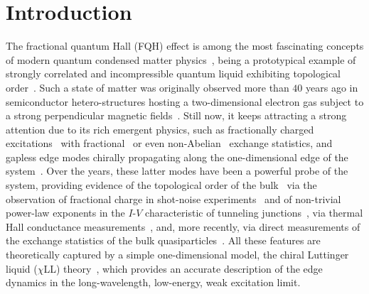 \documentclass[twocolumn,pra,superscriptaddress,noshowpacs]{revtex4}
\begin{document}
\section{Introduction }\label{sec:introduction}
The fractional quantum Hall (FQH) effect is among the most fascinating concepts of modern quantum condensed matter physics~\cite{jainCompositeFermionsBook_2007,prangeQHE2012}, being a prototypical example of strongly correlated and incompressible quantum liquid exhibiting topological order~\cite{Wen_science_2019}.
Such a state of matter was originally observed more than $40$ years ago in semiconductor hetero-structures hosting a two-dimensional electron gas subject to a strong perpendicular magnetic fields~\cite{Tsui_PRL_1982}. Still now, it keeps attracting a strong attention due to its rich emergent physics, such as fractionally charged excitations~\cite{Laughlin_PRL_1983,Tsui_PRL_1982} with fractional~\cite{Arovas_PRL_1984} or even non-Abelian~\cite{Nayak_RMP_2008} exchange statistics, and gapless edge modes chirally propagating along the one-dimensional edge of the system~\cite{Wen_PRL_1990,Wen_PRB_1990b,Wen_PRB_1991, Wen_AdvPhys_1995,Wen_intJModPhysB_1992,Chang_RMP_2003}.
Over the years, these latter modes have been a powerful probe of the system, providing evidence of the topological order of the bulk~\cite{Wen_AdvPhys_1995} via the observation of fractional charge in shot-noise experiments~\cite{dePicciotto_nat_1997} and of non-trivial power-law exponents in the $I$-$V$ characteristic of tunneling junctions~\cite{Chang_PRL_1996, Chang_RMP_2003}, via thermal Hall conductance measurements~\cite{Banerjee_Nat_2018,Umansky_NatPhys_2023}, and, more recently, via direct measurements of the exchange statistics of the bulk quasiparticles~\cite{Nakamura_Nature_2020,Bartolomei_science_2020}. %
All these features are theoretically captured by a simple one-dimensional model, the chiral Luttinger liquid ($\chi$LL) theory~\cite{Wen_AdvPhys_1995}, which provides an accurate description of the edge dynamics in the long-wavelength, low-energy, weak excitation limit. 
\end{document}
